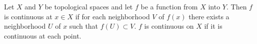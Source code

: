 Let $X$ and $Y$ be topological spaces and let $f$ be a function from $X$ into $Y$. Then $f$ is continuous at $x \in X$ if for each neighborhood $V$ of $f(x)$ there exists a neighborhood $U$ of $x$ such that $f(U) \subset V$. $f$ is continuous on $X$ if it is continuous at each point.